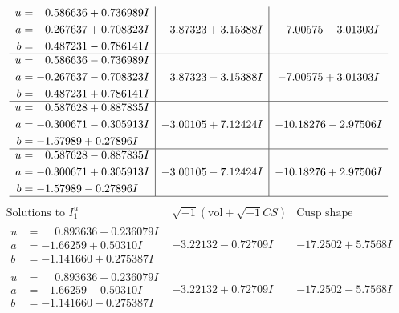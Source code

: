 \documentclass[1p]{elsarticle_modified}
\theoremstyle{definition}
\newcommand{\I}{\sqrt{-1}}
\begin{document}
$$\begin{array}{c|c|c}
\begin{aligned}
u &= \phantom{-}0.586636 + 0.736989 I \\
a &= -0.267637 + 0.708323 I \\
b &= \phantom{-}0.487231 - 0.786141 I\end{aligned}
 & \phantom{-}3.87323 + 3.15388 I & -7.00575 - 3.01303 I \\ \hline\begin{aligned}
u &= \phantom{-}0.586636 - 0.736989 I \\
a &= -0.267637 - 0.708323 I \\
b &= \phantom{-}0.487231 + 0.786141 I\end{aligned}
 & \phantom{-}3.87323 - 3.15388 I & -7.00575 + 3.01303 I \\ \hline\begin{aligned}
u &= \phantom{-}0.587628 + 0.887835 I \\
a &= -0.300671 - 0.305913 I \\
b &= -1.57989 + 0.27896 I\end{aligned}
 & -3.00105 + 7.12424 I & -10.18276 - 2.97506 I \\ \hline\begin{aligned}
u &= \phantom{-}0.587628 - 0.887835 I \\
a &= -0.300671 + 0.305913 I \\
b &= -1.57989 - 0.27896 I\end{aligned}
 & -3.00105 - 7.12424 I & -10.18276 + 2.97506 I\\
 \hline 
 \end{array}$$\newpage$$\begin{array}{c|c|c}  
\text{Solutions to }I^u_{1}& \I (\text{vol} + \sqrt{-1}CS) & \text{Cusp shape}\\
 \hline 
\begin{aligned}
u &= \phantom{-}0.893636 + 0.236079 I \\
a &= -1.66259 + 0.50310 I \\
b &= -1.141660 + 0.275387 I\end{aligned}
 & -3.22132 - 0.72709 I & -17.2502 + 5.7568 I \\ \hline\begin{aligned}
u &= \phantom{-}0.893636 - 0.236079 I \\
a &= -1.66259 - 0.50310 I \\
b &= -1.141660 - 0.275387 I\end{aligned}
 & -3.22132 + 0.72709 I & -17.2502 - 5.7568 I \\ \hline\begin{aligned}

\end{aligned}
\end{array}$$
\end{document}
